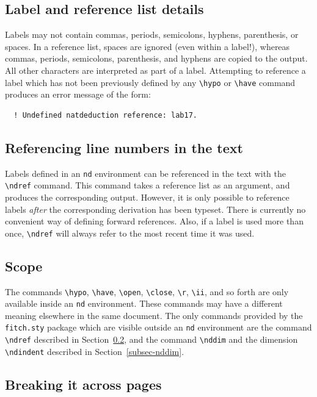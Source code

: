 \documentclass[10pt]{article}
\begin{document}
\subsection{Label and reference list details}

Labels may not contain commas, periods, semicolons, hyphens,
parenthesis, or spaces. In a reference list, spaces are ignored (even
within a label!), whereas commas, periods, semicolons, parenthesis,
and hyphens are copied to the output. All other characters are
interpreted as part of a label. Attempting to reference a label which
has not been previously defined by any \verb!\hypo! or \verb!\have!
command produces an error message of the form:

\begin{verbatim}
  ! Undefined natdeduction reference: lab17.
\end{verbatim}

\subsection{Referencing line numbers in the text}
\label{subsec-ndref}

Labels defined in an \verb!nd! environment can be referenced in the
text with the \verb!\ndref! command. This command takes a reference
list as an argument, and produces the corresponding output. However,
it is only possible to reference labels {\em after} the corresponding
derivation has been typeset. There is currently no convenient way of
defining forward references. Also, if a label is used more than once,
\verb!\ndref! will always refer to the most recent time it was used.

\subsection{Scope}

The commands \verb!\hypo!, \verb!\have!, \verb!\open!, \verb!\close!,
\verb!\r!, \verb!\ii!, and so forth are only available inside an
\verb!nd! environment. These commands may have a different meaning
elsewhere in the same document. The only commands provided by the
\verb!fitch.sty!  package which are visible outside an \verb!nd!
environment are the command \verb!\ndref! described in
Section~\ref{subsec-ndref}, and the command \verb!\nddim! and the
dimension \verb!\ndindent! described in Section~\ref{subsec-nddim}.

\subsection{Breaking it across pages}\label{subsec-break}
\end{document}
